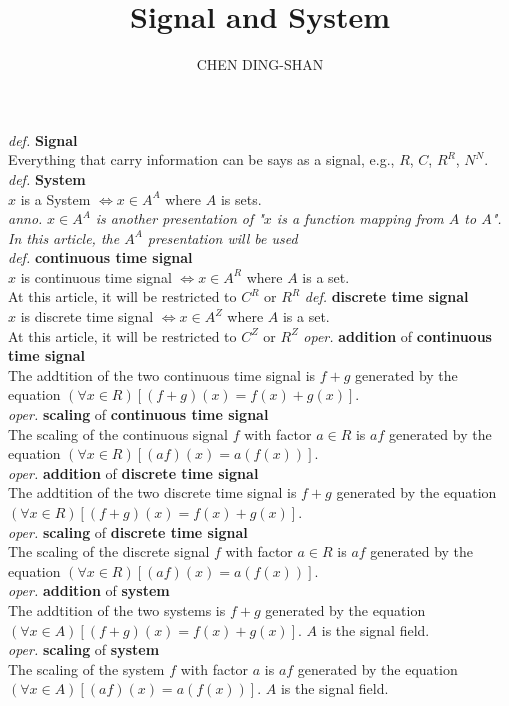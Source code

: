 \documentclass{article}
\title{Signal and System}
\author{CHEN DING-SHAN}
\date{}
\newcommand{\sd}[1]{{\left(#1\right)}}
\newcommand{\df}[1]{\emph{def.} \textbf{#1}}
\newcommand{\anno}[1]{\emph{anno.} \emph{#1}}
\newcommand{\md}[1]{{\left[#1\right]}}
\newcommand{\oper}[2]{\emph{oper.} \textbf{#1} of \textbf{#2}}
\begin{document}
\maketitle
\noindent
\df{Signal}\\
Everything that carry information can be says as a signal, e.g., $R$, $C$, $R^R$, $N^N$.\\
\df{System}\\
$x$ is a System $\iff x \in A^A$ where $A$ is sets.\\
\anno{$x \in A^A$ is another presentation of "$x$ is a function mapping from $A$ to $A$". In this article, the $A^A$ presentation will be used}\\
\df{continuous time signal}\\
$x$ is continuous time signal $\iff x \in A^R$ where $A$ is a set.\\
At this article, it will be restricted to $C^R$ or $R^R$
\df{discrete time signal}\\
$x$ is discrete time signal $\iff x \in A^Z$ where $A$ is a set.\\
At this article, it will be restricted to $C^Z$ or $R^Z$
\oper{addition}{continuous time signal}\\
The addtition of the two continuous time signal is $f+g$ generated by the equation $\sd{\forall x \in R}\md{\sd{f+g}\sd{x} = f\sd{x} + g\sd{x}}$.\\
\oper{scaling}{continuous time signal}\\
The scaling of the continuous signal $f$ with factor $a \in R$ is $af$ generated by the equation $\sd{\forall x \in R}\md{\sd{af}\sd{x} = a\sd{f\sd{x}}}$.\\
\oper{addition}{discrete time signal}\\
The addtition of the two discrete time signal is $f+g$ generated by the equation $\sd{\forall x \in R}\md{\sd{f+g}\sd{x} = f\sd{x} + g\sd{x}}$.\\
\oper{scaling}{discrete time signal}\\
The scaling of the discrete signal $f$ with factor $a \in R$ is $af$ generated by the equation $\sd{\forall x \in R}\md{\sd{af}\sd{x} = a\sd{f\sd{x}}}$.\\
\oper{addition}{system}\\
The addtition of the two systems is $f+g$ generated by the equation $\sd{\forall x \in A}\md{\sd{f+g}\sd{x} = f\sd{x} + g\sd{x}}$. $A$ is the signal field.\\
\oper{scaling}{system}\\
The scaling of the system $f$ with factor $a$ is $af$ generated by the equation $\sd{\forall x \in A}\md{\sd{af}\sd{x} = a\sd{f\sd{x}}}$. $A$ is the signal field.\\
\end{document}
